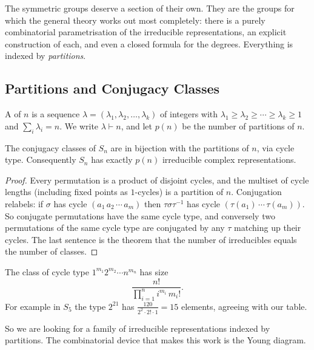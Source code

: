 \documentclass[a4paper]{scrartcl}
\begin{document}
The symmetric groups deserve a section of their own. They are the groups for which the general theory works out most completely: there is a purely combinatorial parametrisation of the irreducible representations, an explicit construction of each, and even a closed formula for the degrees. Everything is indexed by \emph{partitions}.

\subsection{Partitions and Conjugacy Classes}

\begin{definition}[Partition]
	A  of $n$ is a sequence $\lambda = (\lambda_1,\lambda_2,\dots,\lambda_k)$ of integers with $\lambda_1\geq\lambda_2\geq\cdots\geq\lambda_k\geq 1$ and $\sum_i\lambda_i = n$. We write $\lambda\vdash n$, and let $p(n)$ be the number of partitions of $n$.
\end{definition}

\begin{proposition}
	The conjugacy classes of $S_n$ are in bijection with the partitions of $n$, via cycle type. Consequently $S_n$ has exactly $p(n)$ irreducible complex representations.
\end{proposition}
\begin{proof}
	Every permutation is a product of disjoint cycles, and the multiset of cycle lengths (including fixed points as $1$-cycles) is a partition of $n$. Conjugation relabels: if $\sigma$ has cycle $(a_1\,a_2\,\cdots\,a_m)$ then $\tau\sigma\tau^{-1}$ has cycle $(\tau(a_1)\,\cdots\,\tau(a_m))$. So conjugate permutations have the same cycle type, and conversely two permutations of the same cycle type are conjugated by any $\tau$ matching up their cycles. The last sentence is the theorem that the number of irreducibles equals the number of classes.
\end{proof}

\begin{remark}
	The class of cycle type $1^{m_1}2^{m_2}\cdots n^{m_n}$ has size
	$$\frac{n!}{\prod_{i=1}^n i^{m_i}\,m_i!}.$$
	For example in $S_5$ the type $2^21$ has $\frac{120}{2^2\cdot2!\cdot1} = 15$ elements, agreeing with our table.
\end{remark}

So we are looking for a family of irreducible representations indexed by partitions. The combinatorial device that makes this work is the Young diagram.
\end{document}
